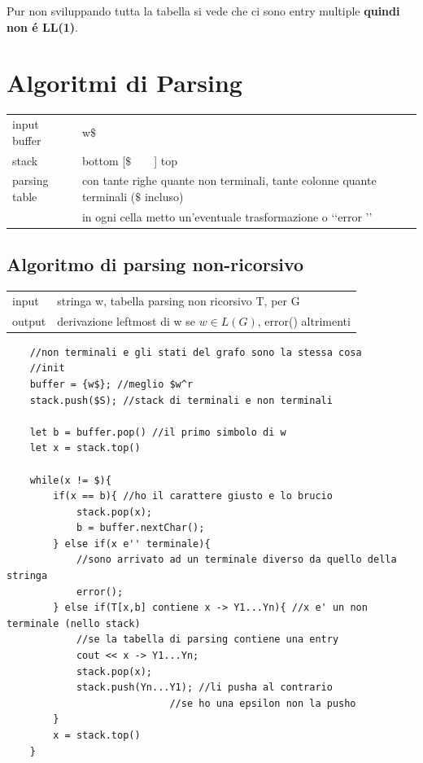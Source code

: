 Pur non sviluppando tutta la tabella si vede che ci sono entry multiple \textbf{quindi non \'e LL(1)}.


\section{Algoritmi di Parsing}
\begin{center}
    \begin{tabular}{ll}
        input buffer    &   w$\$$   \\
        stack           &   bottom [$ \$ \qquad $] top \\
        parsing table   &   con tante righe quante non terminali, tante colonne quante terminali ($ \$ $ incluso)\\
                        &   in ogni cella metto un'eventuale trasformazione o \lq\lq error \rq\rq \\
    \end{tabular}
\end{center}
\subsection{Algoritmo di parsing non-ricorsivo}
\begin{center}
    \begin{tabular}{ll}
        input   &   stringa w, tabella parsing non ricorsivo T, per G\\
        output  &   derivazione leftmost di w se $w \in L(G)$, error() altrimenti\\
    \end{tabular}
\end{center}

\begin{lstlisting}
    //non terminali e gli stati del grafo sono la stessa cosa
    //init
    buffer = {w$}; //meglio $w^r
    stack.push($S); //stack di terminali e non terminali

    let b = buffer.pop() //il primo simbolo di w 
    let x = stack.top()  

    while(x != $){
        if(x == b){ //ho il carattere giusto e lo brucio
            stack.pop(x);
            b = buffer.nextChar();
        } else if(x e'' terminale){ 
            //sono arrivato ad un terminale diverso da quello della stringa
            error();
        } else if(T[x,b] contiene x -> Y1...Yn){ //x e' un non terminale (nello stack)
            //se la tabella di parsing contiene una entry 
            cout << x -> Y1...Yn;
            stack.pop(x);
            stack.push(Yn...Y1); //li pusha al contrario
                            //se ho una epsilon non la pusho
        }
        x = stack.top()
    }
\end{lstlisting}

